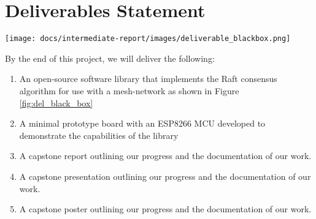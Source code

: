 \section{Deliverables Statement}

\begingroup
    \centering
    \medskip
    \texttt{[image: docs/intermediate-report/images/deliverable\_blackbox.png]}
    \label{fig:del_black_box}
    \medskip
\endgroup

By the end of this project, we will deliver the following: 

\begin{enumerate}
  \item An open-source software library that implements the Raft consensus algorithm for use with a mesh-network as shown in Figure \ref{fig:del_black_box}
  \item A minimal prototype board with an ESP8266 MCU developed to demonstrate the capabilities of the library 
  \item A capstone report outlining our progress and the documentation of our work.
  \item A capstone presentation outlining our progress and the documentation of our work.
  \item A capstone poster outlining our progress and the documentation of our work.

\end{enumerate}
